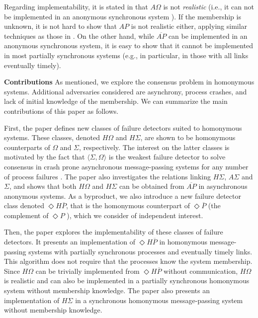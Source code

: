 \documentclass[10pt, conference, compsocconf]{IEEEtran}
\newcommand{\tightparagraph}[1]{\smallskip \noindent \textbf{#1} \hspace{1ex}}
\newcommand{\HO}{{H\Omega}}
\newcommand{\AO}{{A\Omega}}
\newcommand{\HS}{{H\Sigma}}
\newcommand{\HP}{{ \Diamond H\overline{P}}}
\newcommand{\AP}{{ \mathit{AP}}}
\newcommand{\NAP}{{ \overline{\mathit{AP}}}}
\begin{document}
Regarding implementability, it is stated 
in \cite{DBLP:conf/wdag/BonnetR10} that $\AO$ is not \emph{realistic}
(i.e., it can not be implemented in an anonymous  synchronous system 
\cite{DBLP:conf/dsn/Delporte-GalletFG02}). If the membership is
unknown, it is not hard to show that $\AP$ is not realistic either, 
applying similar techniques as those in
\cite{DBLP:journals/ipl/JimenezAF06}. On the other hand, 
while $\NAP$ can be implemented in an anonymous  
synchronous system, it is easy to show that it cannot be 
implemented in most partially synchronous systems 
(e.g., in particular, in those with all links eventually timely).



\tightparagraph{Contributions}
As mentioned, we explore the consensus problem in homonymous systems. 
Additional adversaries considered are
asynchrony, process crashes, and lack of initial knowledge of the membership. 
We can summarize the main contributions of this paper as follows.

First, the paper defines new classes  of failure detectors suited  
to homonymous
systems. These classes, denoted $\HO$ and  $\HS$, 
are shown to be homonymous counterparts of  $\Omega$ and  $\Sigma$, 
respectively.
The interest on the latter classes is motivated by the fact that  
$\langle \Sigma,\Omega\rangle$ is the weakest failure detector 
to solve consensus in crash prone asynchronous message-passing systems 
for any  number of  process failures  
\cite{DBLP:journals/jacm/Delporte-GalletFG10}.  
The paper also investigates the relations linking $\mathit{H\Sigma}$, 
$\mathit{A\Sigma}$ and  $\Sigma$, and shows that both 
$\HO$ and  $\HS$ can be obtained
from $\NAP$ in asynchronous anonymous systems. 
As a byproduct, we also introduce a new
failure detector class denoted  $\HP$,
that is the homonymous counterpart of  $\Diamond\overline{P}$
(the complement of   $\Diamond P$  \cite{DBLP:journals/jacm/ChandraT96}),
which we consider of independent interest.

Then, the paper explores the implementability of these classes 
of failure detectors.
It presents an implementation of  $\HP$ in  homonymous message-passing  
systems  with  partially synchronous processes  and eventually timely  links.
This algorithm does  not require that the processes know the system
 membership. 
Since $\HO$ can be trivially implemented from $\HP$ without communication,
$\HO$ is realistic and can also be implemented in a partially synchronous 
homonymous system without membership knowledge. The paper also presents 
an implementation of  $\HS$
in  a  synchronous homonymous message-passing  system
without membership knowledge.
\end{document}
